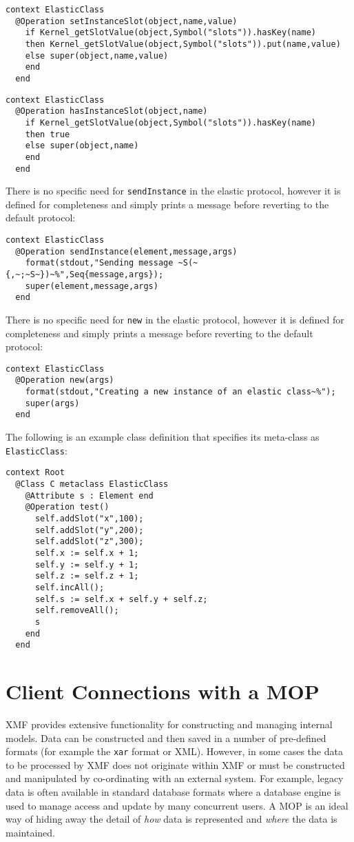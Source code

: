 \documentclass{article}
\begin{document}
\begin{verbatim}
context ElasticClass
  @Operation setInstanceSlot(object,name,value)
    if Kernel_getSlotValue(object,Symbol("slots")).hasKey(name)
    then Kernel_getSlotValue(object,Symbol("slots")).put(name,value)
    else super(object,name,value)
    end
  end
\end{verbatim}
\begin{verbatim}
context ElasticClass
  @Operation hasInstanceSlot(object,name)
    if Kernel_getSlotValue(object,Symbol("slots")).hasKey(name)
    then true
    else super(object,name)
    end
  end
\end{verbatim}
There is no specific need for {\tt sendInstance} in the elastic protocol,
however it is defined for completeness and simply prints a message before
reverting to the default protocol:
\begin{verbatim}
context ElasticClass
  @Operation sendInstance(element,message,args)
    format(stdout,"Sending message ~S(~{,~;~S~})~%",Seq{message,args});
    super(element,message,args)
  end 
\end{verbatim}
There is no specific need for {\tt new} in the elastic protocol,
however it is defined for completeness and simply prints a message before
reverting to the default protocol:
\begin{verbatim}
context ElasticClass
  @Operation new(args)
    format(stdout,"Creating a new instance of an elastic class~%");
    super(args)
  end
\end{verbatim}
The following is an example class definition that specifies its meta-class as
{\tt ElasticClass}:
\begin{verbatim}
context Root
  @Class C metaclass ElasticClass
    @Attribute s : Element end
    @Operation test()
      self.addSlot("x",100);
      self.addSlot("y",200);
      self.addSlot("z",300);
      self.x := self.x + 1;
      self.y := self.y + 1;
      self.z := self.z + 1;
      self.incAll();
      self.s := self.x + self.y + self.z;
      self.removeAll();
      s
    end
  end
\end{verbatim}

\section{Client Connections with a MOP}

XMF provides extensive functionality for constructing and managing internal
models. Data can be constructed and then saved in a number of pre-defined
formats (for example the {\tt xar} format or XML). However, in some cases
the data to be processed by XMF does not originate within XMF or must be
constructed and manipulated by co-ordinating with an external system. For
example, legacy data is often available in standard database formats where
a database engine is used to manage access and update by many concurrent users.
A MOP is an ideal way of hiding away the detail of {\em how} data is represented
and {\em where} the data is maintained. 
\end{document}
